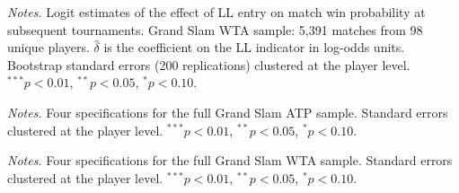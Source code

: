 \begin{table}[htbp]
\centering
\caption{Grand Slam Tournament Performance: WTA (Full Sample)}
\label{tab:tournament_gs_wta_full}
\begin{threeparttable}
\small

\begin{tablenotes}
\footnotesize
\item \textit{Notes.} Logit estimates of the effect of LL entry on match win probability at subsequent tournaments. Grand Slam WTA sample: 5,391 matches from 98 unique players. $\hat{\delta}$ is the coefficient on the LL indicator in log-odds units. Bootstrap standard errors (200 replications) clustered at the player level. $^{***}p<0.01$, $^{**}p<0.05$, $^{*}p<0.10$.
\end{tablenotes}
\end{threeparttable}
\end{table}

\begin{table}[htbp]
\centering
\caption{Grand Slam Tournament Robustness: ATP (Full Sample, Four Specifications)}
\label{tab:tournament_robust_gs_atp_full}
\begin{threeparttable}
\small

\begin{tablenotes}
\footnotesize
\item \textit{Notes.} Four specifications for the full Grand Slam ATP sample. Standard errors clustered at the player level. $^{***}p<0.01$, $^{**}p<0.05$, $^{*}p<0.10$.
\end{tablenotes}
\end{threeparttable}
\end{table}

\begin{table}[htbp]
\centering
\caption{Grand Slam Tournament Robustness: WTA (Full Sample, Four Specifications)}
\label{tab:tournament_robust_gs_wta_full}
\begin{threeparttable}
\small

\begin{tablenotes}
\footnotesize
\item \textit{Notes.} Four specifications for the full Grand Slam WTA sample. Standard errors clustered at the player level. $^{***}p<0.01$, $^{**}p<0.05$, $^{*}p<0.10$.
\end{tablenotes}
\end{threeparttable}
\end{table}

